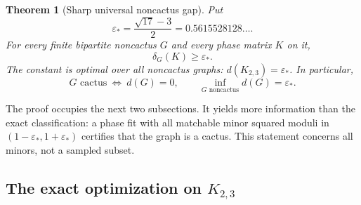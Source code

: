 \documentclass[11pt]{article}
\numberwithin{equation}{section}
\newtheorem{theorem}{Theorem}[section]
\theoremstyle{definition}
\newcommand{\epsstar}{\varepsilon_*}
\begin{document}
\begin{theorem}[Sharp universal noncactus gap]
\label{cac:thm:gap}
Put
\[
 \epsstar=\frac{\sqrt{17}-3}{2}=0.5615528128\ldots.
\]
For every finite bipartite noncactus $G$ and every phase matrix $K$ on it,
\begin{equation}
 \delta_G(K)\ge\epsstar.
 \label{cac:eq:universalgap}
\end{equation}
The constant is optimal over all noncactus graphs: $d(K_{2,3})=\epsstar$. In particular,
\[
 G\text{ cactus}\ \Longleftrightarrow\ d(G)=0,
 \qquad
 \inf_{G\text{ noncactus}}d(G)=\epsstar.
\]
\end{theorem}

The proof occupies the next two subsections. It yields more information than the exact classification: a phase fit with all matchable minor squared moduli in $(1-\epsstar,1+\epsstar)$ certifies that the graph is a cactus. This statement concerns all minors, not a sampled subset.

\subsection{The exact optimization on \texorpdfstring{$K_{2,3}$}{K2,3}}
\end{document}

